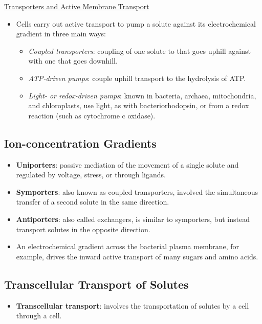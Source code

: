 \documentclass[12pt,letterpaper]{article}
\begin{document}
\hypertarget{11.2}{}
\begin{secbox}{\hyperlink{11}{Transporters and Active Membrane Transport}}{
    \begin{itemize}
        \item Cells carry out active transport to pump a solute against its electrochemical gradient in three main ways:
            \begin{itemize}
                \item \textit{Coupled transporters}: coupling of one solute to that goes uphill against with one that goes downhill.
                \item \textit{ATP-driven pumps}: couple uphill transport to the hydrolysis of ATP.
                \item \textit{Light- or redox-driven pumps}: known in bacteria, archaea, mitochondria, and chloroplasts, use light, as with bacteriorhodopsin, or from a redox reaction (such as cytochrome c oxidase).
            \end{itemize}
    \end{itemize}
    \hypertarget{11.2.1}{\subsection*{Ion-concentration Gradients}}
    \begin{itemize}
        \item \textbf{Uniporters}: passive mediation of the movement of a single solute and regulated by voltage, stress, or through ligands. 
        \item \textbf{Symporters}: also known as coupled transporters, involved the simultaneous transfer of a second solute in the same direction. 
        \item \textbf{Antiporters}: also called exchangers, is similar to symporters, but instead transport solutes in the opposite direction.
        \item An electrochemical  gradient across the bacterial plasma membrane, for example, drives the inward active transport of many sugars and amino acids. 
    \end{itemize}

    \hypertarget{11.2.2}{\subsection*{Transcellular Transport of Solutes}}
    \begin{itemize}
        \item \textbf{Transcellular transport}: involves the transportation of solutes by a cell through a cell.
    \end{itemize}

}
\end{secbox}
\end{document}
